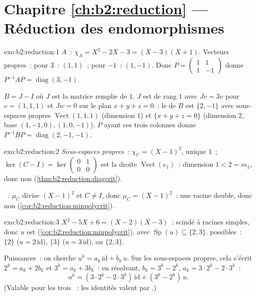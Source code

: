 \section*{Chapitre \ref{ch:b2:reduction} --- Réduction des endomorphismes}

\begin{solution}{exo:b2:reduction:1}
$A$~: $\chi_A = X^2 - 2X - 3 = (X - 3)(X + 1)$. Vecteurs propres~: pour
$3$~: $(1,1)$~; pour $-1$~: $(1,-1)$. Donc $P = \begin{pmatrix} 1 & 1\\ 1
& -1\end{pmatrix}$ donne $P^{-1}AP = \operatorname{diag}(3, -1)$.

$B = J - I$ où $J$ est la matrice remplie de $1$. $J$ est de rang $1$
avec $Jv = 3v$ pour $v = (1,1,1)$ et $Jw = 0$ sur le plan $x + y + z =
0$~: le  de $B$ est $\{2, -1\}$ avec sous-espaces propres
$\operatorname{Vect}(1,1,1)$ (dimension $1$) et $\{x + y + z = 0\}$
(dimension $2$, base $(1,-1,0), (1,0,-1)$). $P$ ayant ces trois
colonnes donne $P^{-1}BP = \operatorname{diag}(2, -1, -1)$.
\end{solution}

\begin{solution}{exo:b2:reduction:2}
\emph{Sous-espaces propres~:} $\chi_C = (X-1)^2$,  unique
$1$~; $\ker(C - I) = \ker\begin{pmatrix} 0&1\\ 0&0\end{pmatrix}$ est la
droite $\operatorname{Vect}(e_1)$~: dimension $1 < 2 = m_1$, donc non
 (\cref{thm:b2:reduction:diagcrit}).

\emph{~:} $\mu_C$ divise $(X-1)^2$ et $C \neq I$, donc
$\mu_C = (X-1)^2$~: une racine double, donc non 
(\cref{cor:b2:reduction:minpolycrit}).
\end{solution}

\begin{solution}{exo:b2:reduction:3}
$X^2 - 5X + 6 = (X-2)(X-3)$~: scindé à racines simples, donc $u$ est
 (\cref{cor:b2:reduction:minpolycrit}), avec
$\operatorname{Sp}(u) \subseteq \{2, 3\}$.  possibles~:
$\{2\}$ ($u = 2\,\mathrm{id}$), $\{3\}$ ($u = 3\,\mathrm{id}$), ou
$\{2, 3\}$.

Puissances~: on cherche $u^k = a_k\,\mathrm{id} + b_k\,u$. Sur les
sous-espaces propres, cela s'écrit $2^k = a_k + 2b_k$ et $3^k = a_k +
3b_k$~: en résolvant, $b_k = 3^k - 2^k$, $a_k = 3\cdot2^k - 2\cdot
3^k$~:
\[
u^k = (3\cdot 2^k - 2\cdot 3^k)\,\mathrm{id} + (3^k - 2^k)\, u .
\]
(Valable pour les trois ~: les identités valent 
par .)
\end{solution}

